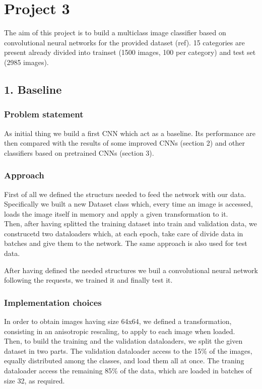 \documentclass[12pt, a4paper]{report}
\begin{document}
\chapter*{Project 3}
		
The aim of this project is to build a multiclass image classifier based on convolutional neural networks for the provided dataset (ref). 15 categories are present already divided into trainset (1500 images, 100 per category) and test set (2985 images).
	
	
\section*{1. Baseline}
\subsection*{Problem statement}
	
As initial thing we build a first CNN which act as a baseline. Its performance are then compared with the results of some improved CNNs (section 2) and other classifiers based on pretrained CNNs (section 3).
	
\subsection*{Approach}

First of all we  defined the structurs needed to feed the network with our data.\\
Specifically we built a new Dataset class which, every time an image is accessed, loads the image itself in memory and apply a given transformation to it.\\
Then, after having splitted the training dataset into train and validation data, we construcetd two dataloaders which, at each epoch, take care of divide data in batches and give them to the network. The same approach is also used for test data.

After having defined the needed structures we buil a convolutional neural network following the requests, we trained it and finally test it.
	
\subsection*{Implementation choices}

In order to obtain images having size 64x64, we defined a transformation, consisting in an anisotropic rescaling, to apply to each image when loaded.\\
Then, to build the training and the validation dataloaders, we split the given dataset in two parts. The validation dataloader access to the 15\% of the images, equally distributed among the classes, and load them all at once. The traning dataloader access the remaining 85\% of the data, which are loaded in batches of size 32, as required.
\end{document}
